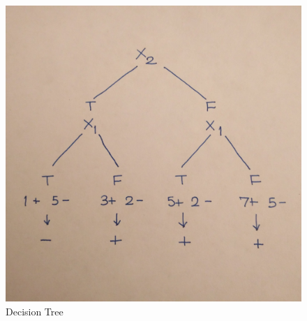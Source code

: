 \documentclass[english]{article}
\begin{document}
\begin{figure}[H]
\centering
\includegraphics[scale = 0.075]{DT}
\caption{Decision Tree}
\label{fig:DT}
\end{figure}
\end{document}
